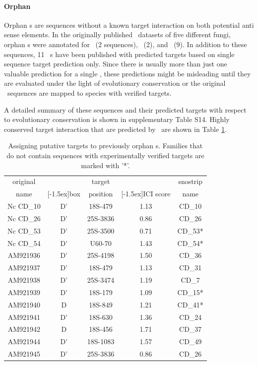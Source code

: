 \paragraph{\textbf{Orphan \sno}}
Orphan \sno s are sequences without a known target interaction on both
potential anti sense elements. In the originally published \sno\
datasets of five different fungi, orphan \cd s were annotated for
\sce\ (2 sequences), \ncr\ (2), and \afu\ (9). In addition to these
sequences, 11 \ncr\ \sno s have been published with predicted targets
based on single sequence target prediction only. Since there is
usually more than just one valuable prediction for a single \sno,
these predictions might be misleading until they are evaluated under
the light of evolutionary conservation or the original \sno\ sequences
are mapped to species with verified targets.

A detailed summary of these sequences and their predicted targets with
respect to evolutionary conservation is shown in supplementary Table
S14. Highly conserved target interaction that are predicted by
\snostrip\ are shown in Table \ref{tab:orphan_cd_snoRNAs_short}.

\begin{table}
  \caption{Assigning putative targets to previously
    orphan \cd s. Families that do not contain sequences with
    experimentally verified targets are marked with '*'. }
  \label{tab:orphan_cd_snoRNAs_short}
  \begin{center}
    \begin{footnotesize}
      \begin{tabular}{c|c|c|c|c}
      original&&target&&snostrip\\
      name&\raisebox{1.5ex}[-1.5ex]{box}&position&\raisebox{1.5ex}[-1.5ex]{ICI
      score}&name\\
  \hline
  Nc CD\_10&D'&18S-479&1.13&CD\_10\\
\hline
  Nc CD\_26&D'&25S-3836&0.86&CD\_26\\
\hline
  Nc CD\_53&D'&25S-3500&0.71&CD\_53*\\
\hline
  Nc CD\_54&D'&U60-70&1.43&CD\_54*\\
 \hline
  AM921936&D'&25S-4198&1.50&CD\_36\\
\hline
  AM921937&D'&18S-479&1.13&CD\_31\\
\hline
  AM921938&D'&25S-3474&1.19&CD\_7\\
\hline
  AM921939&D'&18S-179&1.09&CD\_15*\\
\hline
  AM921940&D&18S-849&1.21&CD\_41*\\
\hline
  AM921941&D'&18S-630&1.36&CD\_24\\
\hline
  AM921942&D&18S-456&1.71&CD\_37\\
\hline
  AM921944&D'&18S-1083&1.57&CD\_49\\
\hline
  AM921945&D'&25S-3836&0.86&CD\_26\\

    \end{tabular}
    \end{footnotesize}
  \end{center} 
\end{table}

